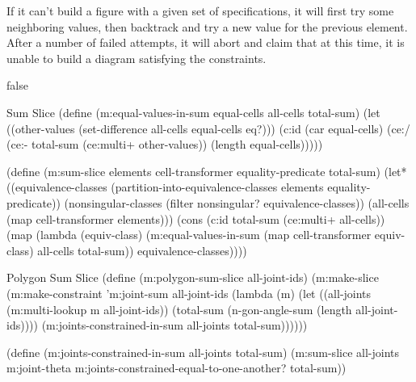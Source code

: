 If it can't build a figure with a given set of specifications, it will
first try some neighboring values, then backtrack and try a new value
for the previous element. After a number of failed attempts, it will
abort and claim that at this time, it is unable to build a diagram
satisfying the constraints.


\if false
\begin{code-listing}
[label=sum-slice]
{Sum Slice}
(define (m:equal-values-in-sum equal-cells all-cells total-sum)
  (let ((other-values (set-difference all-cells equal-cells eq?)))
    (c:id (car equal-cells)
          (ce:/ (ce:- total-sum (ce:multi+ other-values))
                (length equal-cells)))))

(define (m:sum-slice elements cell-transformer equality-predicate total-sum)
  (let* ((equivalence-classes
          (partition-into-equivalence-classes elements equality-predicate))
         (nonsingular-classes (filter nonsingular? equivalence-classes))
         (all-cells (map cell-transformer elements)))
    (cons (c:id total-sum (ce:multi+ all-cells))
          (map (lambda (equiv-class)
                 (m:equal-values-in-sum
                  (map cell-transformer equiv-class) all-cells total-sum))
               equivalence-classes))))
\end{code-listing}

\begin{code-listing}
[label=poly-sum-slice]
{Polygon Sum Slice}
(define (m:polygon-sum-slice all-joint-ids)
  (m:make-slice
   (m:make-constraint 'm:joint-sum all-joint-ids
    (lambda (m)
      (let ((all-joints (m:multi-lookup m all-joint-ids))
            (total-sum (n-gon-angle-sum (length all-joint-ids))))
        (m:joints-constrained-in-sum all-joints total-sum))))))

(define (m:joints-constrained-in-sum all-joints total-sum)
  (m:sum-slice all-joints m:joint-theta
   m:joints-constrained-equal-to-one-another? total-sum))
\end{code-listing}


\fi
